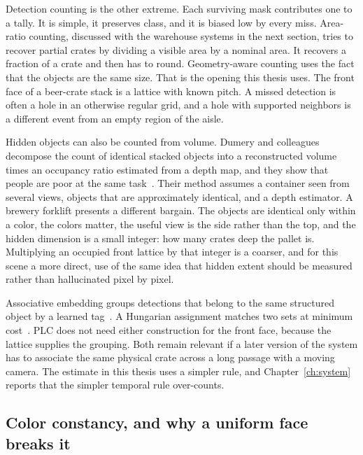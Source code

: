 Detection counting is the other extreme. Each surviving mask contributes one to a tally. It is simple, it preserves class, and it is biased low by every miss. Area-ratio counting, discussed with the warehouse systems in the next section, tries to recover partial crates by dividing a visible area by a nominal area. It recovers a fraction of a crate and then has to round. Geometry-aware counting uses the fact that the objects are the same size. That is the opening this thesis uses. The front face of a beer-crate stack is a lattice with known pitch. A missed detection is often a hole in an otherwise regular grid, and a hole with supported neighbors is a different event from an empty region of the aisle.

Hidden objects can also be counted from volume. Dumery and colleagues decompose the count of identical stacked objects into a reconstructed volume times an occupancy ratio estimated from a depth map, and they show that people are poor at the same task~\cite{dumery2024stacked}. Their method assumes a container seen from several views, objects that are approximately identical, and a depth estimator. A brewery forklift presents a different bargain. The objects are identical only within a color, the colors matter, the useful view is the side rather than the top, and the hidden dimension is a small integer: how many crates deep the pallet is. Multiplying an occupied front lattice by that integer is a coarser, and for this scene a more direct, use of the same idea that hidden extent should be measured rather than hallucinated pixel by pixel.

Associative embedding groups detections that belong to the same structured object by a learned tag~\cite{newell2017ae}. A Hungarian assignment matches two sets at minimum cost~\cite{kuhn1955hungarian}. PLC does not need either construction for the front face, because the lattice supplies the grouping. Both remain relevant if a later version of the system has to associate the same physical crate across a long passage with a moving camera. The estimate in this thesis uses a simpler rule, and Chapter~\ref{ch:system} reports that the simpler temporal rule over-counts.

\subsection{Color constancy, and why a uniform face breaks it}
\label{sec:color-principles}

